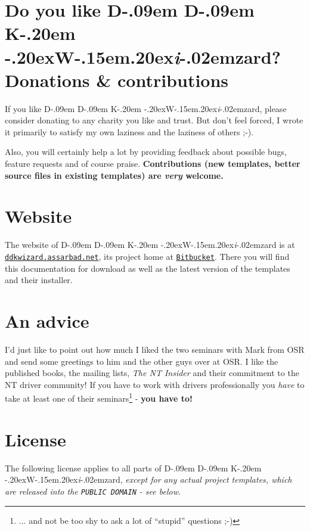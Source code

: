 \documentclass[a4paper,titlepage]{report}
\newcommand{\linkclr}[1]{\textcolor[rgb]{0.00,0.00,0.60}{#1}}
\newcommand{\important}[1]{\textcolor[rgb]{0.90,0.00,0.00}{\textbf{#1}}}
\newcommand{\extlinktt}[2]{\href{#1}{\texttt{\linkclr{#2}}}}
\def\ddkwiz{\texorpdfstring{D\kern-.09em D\kern-.09em K\kern-.20em \raise-.20ex\hbox{W}\kern-.15em\raise.20ex\hbox{\it{i}}\kern-.02em{zard}}{DDKWizard}}
\begin{document}
\section*{Do you like \ddkwiz{}? Donations \& contributions}
If you like \ddkwiz{}, please consider donating to any charity you
like and trust. But don't feel forced, I wrote it primarily to satisfy my own
laziness and the laziness of others \textsf{;-)}.

Also, you will certainly help a lot by providing feedback about possible bugs,
feature requests and of course praise. \important{Contributions (new templates,
better source files in existing templates) are \emph{very} welcome.}

\section*{Website}
The website of \ddkwiz{} is at \extlinktt{http://ddkwizard.assarbad.net}{ddkwizard.assarbad.net}, its project home at \extlinktt{https://bitbucket.org/assarbad/ddkwizard}{Bitbucket}.
There you will find this documentation for download as well as the latest
version of the templates and their installer.

\section*{An advice}
I'd just like to point out how much I liked the two seminars with Mark from
OSR and send some greetings to
him and the other guys over at OSR. I like the published books, the mailing
lists, \emph{The NT Insider} and their commitment to the NT driver community!
If you have to work with drivers professionally you \emph{have} to take at least
one of their seminars\footnote{... and not be too shy to ask a lot of ``stupid''
questions \textsf{;-)}} - \textbf{you have to!}

\section*{License}

The following license applies to all parts of \ddkwiz{}, \emph{except for any actual project templates, which are released into the \texttt{PUBLIC DOMAIN} - see below}.
\end{document}
